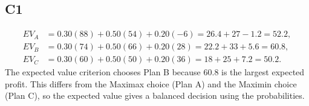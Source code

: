 \begin{ExamProblems}
		\subsection*{C1}
		\[
		\begin{aligned}
		EV_A &= 0.30(88)+0.50(54)+0.20(-6)=26.4+27-1.2=52.2,\\
		EV_B &= 0.30(74)+0.50(66)+0.20(28)=22.2+33+5.6=60.8,\\
		EV_C &= 0.30(60)+0.50(50)+0.20(36)=18+25+7.2=50.2.
		\end{aligned}
		\]
		The expected value criterion chooses Plan B because $60.8$ is the largest expected profit. This differs from the Maximax choice (Plan A) and the Maximin choice (Plan C), so the expected value gives a balanced decision using the probabilities.
	\end{ExamProblems}

